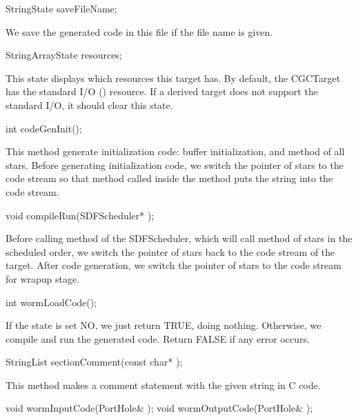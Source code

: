 {\begin{example}
StringState saveFileName;
\end{example}

We save the generated code in this file if the file name is given.

\begin{example}
StringArrayState resources;
\end{example}

This state displays which resources this target has. By default, the
CGCTarget has the standard I/O () resource. If a derived
target does not support the standard I/O, it should clear this state.

\begin{example}
int codeGenInit();
\end{example}

This method generate initialization code: buffer initialization, and
 method of all stars. Before generating initialization code,
we switch the  pointer of stars to the  code
stream so that  method called inside the 
method puts the string into the  code stream.

\begin{example}
void compileRun(SDFScheduler* );
\end{example}

Before calling  method of the SDFScheduler, which will
call  method of stars in the scheduled order, we switch the
 pointer of stars back to the  code stream
of the target. After code generation, we switch the pointer of stars to
the  code stream for wrapup stage.

\begin{example}
int wormLoadCode();
\end{example}

If the  state is set NO, we just return TRUE, doing nothing.
Otherwise, we compile and run the generated code. Return FALSE if any
error occurs.

\begin{example}
StringList sectionComment(const char* );
\end{example}

This method makes a comment statement with the given string in C code.

\begin{example}
void wormInputCode(PortHole& );
void wormOutputCode(PortHole& );
\end{example}

}
